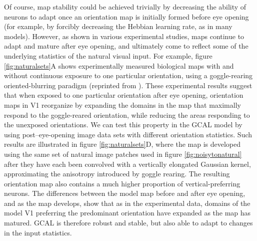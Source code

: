 \documentclass{article}
\begin{document}
Of course, map stability could be achieved trivially by decreasing the
ability of neurons to adapt once an orientation map is initially
formed before eye opening (for example, by forcibly decreasing the
Hebbian learning rate, as in many models). However, as shown in
various experimental studies, maps continue to adapt and mature after
eye opening, and ultimately come to reflect some of the underlying
statistics of the natural visual input.
For example, figure \ref{fig:naturalsets}A shows experimentally
measured biological maps with and without continuous
exposure to one particular orientation, using a goggle-rearing
oriented-blurring paradigm (reprinted
from \citealp{Tanaka2009}). These experimental results suggest that when
exposed to one particular orientation after eye opening, orientation
maps in V1 reorganize by expanding the domains in the map that
maximally respond to the goggle-reared orientation, while reducing the areas
responding to the unexposed orientations. We can test this property in
the GCAL model by using post--eye-opening image data sets with
different orientation statistics.  Such results are
illustrated in figure \ref{fig:naturalsets}D, where the map is
developed using the same set of natural image
  patches used in figure \ref{fig:noisytonatural} after they have each
  been convolved with a vertically elongated Gaussian kernel,
  approximating the anisotropy introduced by goggle rearing. The
resulting orientation map also contains a much higher proportion of
vertical-preferring neurons. The differences between the model map
before and after eye opening, and as the map develops, show that as
in the experimental data, domains of the model V1 preferring the
predominant orientation have expanded as the map has matured. GCAL is
therefore robust and stable, but also able to adapt to changes in the
input statistics.
\end{document}
